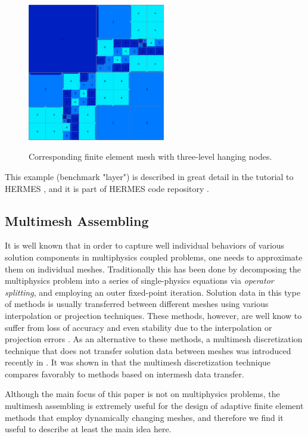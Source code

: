 \documentclass[final,3p,times,twocolumn]{elsarticle}
\begin{document}
\begin{figure}[!htb]
\begin{center}
 {
\includegraphics[width=6cm]{atan-1.png}
}
\end{center}
\vspace{-5mm}
\caption{Corresponding finite element mesh with three-level hanging nodes.}
\label{fig:atan-1}
\end{figure}

This example (benchmark "layer") is described in great detail in the tutorial to 
HERMES \cite{hermes}, and it is part of HERMES code repository \cite{hermes-repo}.

\subsection{Multimesh Assembling}\label{subsec:multimesh}


It is well known that in order to capture well individual behaviors 
of various solution components in multiphysics coupled problems, 
one needs to approximate them on individual meshes. 
Traditionally this has been done by decomposing the multiphysics 
problem into a series of single-physics equations via {\em operator 
splitting}, and employing an outer fixed-point iteration. 
Solution data in this type of methods is 
usually transferred between different meshes using various 
interpolation or projection techniques. These methods, however, 
are well know to suffer from loss of accuracy and even stability 
due to the interpolation or projection errors \cite{jiao}. As an 
alternative to these methods, a multimesh discretization technique 
that does not transfer solution data between meshes
was introduced recently in \cite{spacetime-1,spacetime-2}. It was shown 
in \cite{dubcova} that the multimesh discretization technique
compares favorably to methods based on intermesh data transfer.
 

Although the main focus of this paper is not on multiphysics problems, the 
multimesh assembling is extremely useful for the design 
of adaptive finite element methods that employ dynamically 
changing meshes, and therefore we find it useful to describe 
at least the main idea here. 
\end{document}
